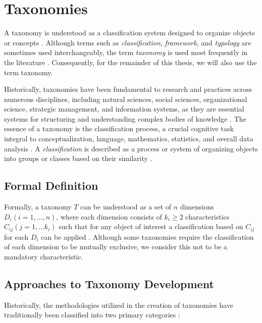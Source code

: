 
\section{Taxonomies}
\label{sec:fundamentals_taxonomy}

A taxonomy is understood as a classification system designed to organize objects or concepts \cite{kundisch_update_2022,usman_taxonomies_2017,nickerson_method_2013,kaplan_introducing_2022}. Although terms such as \emph{classification}, \emph{framework}, and \emph{typology} are sometimes used interchangeably, the term \emph{taxonomy} is used most frequently in the literature \cite{nickerson_method_2013}. Consequently, for the remainder of this thesis, we will also use the term taxonomy.

Historically, taxonomies have been fundamental to research and practices across numerous disciplines, including natural sciences, social sciences, organizational science, strategic management, and information systems, as they are essential systems for structuring and understanding complex bodies of knowledge \cite{nickerson_method_2013,kundisch_update_2022}. The essence of a taxonomy is the classification process, a crucial cognitive task integral to conceptualization, language, mathematics, statistics, and overall data analysis \cite[7,11]{bailey_typologies_2003}. A \emph{classification} is described as a process or system of organizing objects into groups or classes based on their similarity \cite{nickerson_method_2013}.

\subsection{Formal Definition}
Formally, a taxonomy $T$ can be understood as a set of $n$ dimensions $D_i(i=1, \dots,n)$, where each dimension consists of $k_i \geq2$ characteristics $C_{ij}(j=1,\dots k_i)$ such that for any object of interest a classification based on $C_{ij}$ for each $D_i$ can be applied \cite{nickerson_method_2013}. Although some taxonomies require the classification of each dimension to be mutually exclusive, we consider this not to be a mandatory characteristic.


\subsection{Approaches to Taxonomy Development}

Historically, the methodologies utilized in the creation of taxonomies have traditionally been classified into two primary categories \cite{bailey_typologies_2003,nickerson_method_2013}:

